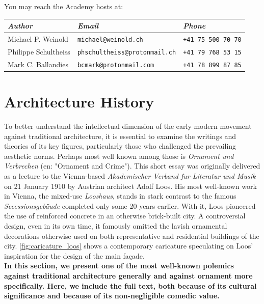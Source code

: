 \documentclass[a4paper]{article}
\begin{document}
You may reach the Academy hosts at:

\begin{NiceTabularX}{\textwidth}{llX}
\textit{Author} & \textit{Email} & \textit{Phone} \\
\hline
Michael P. Weinold & \texttt{michael@weinold.ch} & \texttt{+41 75 500 70 70} \\
Philippe Schultheiss & \texttt{phschultheiss@protonmail.ch} & \texttt{+41 79 768 53 15} \\
Mark C. Ballandies & \texttt{bcmark@protonmail.com} & \texttt{+41 78 899 87 85}
\end{NiceTabularX}

\tableofcontents

\clearpage
\section{Architecture History}

\begin{mdframed}[linewidth=1pt, roundcorner=5pt, innerleftmargin=10pt, innerrightmargin=10pt, innertopmargin=10pt, innerbottommargin=10pt, linecolor=black, backgroundcolor=white, userdefinedwidth=\textwidth]
    To better understand the intellectual dimension of the early modern movement against traditional architecture, it is essential to examine the writings and theories of its key figures, particularly those who challenged the prevailing aesthetic norms. Perhaps most well known among those is \textit{Ornament und Verbrechen} \cite{loos_ornament_1908} (en: "Ornament and Crime"). This short essay was originally delivered as a lecture to the Vienna-based \textit{Akademischer Verband fur Literatur und Musik} on 21 January 1910 by Austrian architect Adolf Loos. His most well-known work in Vienna, the mixed-use \textit{Looshaus}, stands in stark contrast to the famous \textit{Secessionsgebäude} completed only some 20 years earlier. With it, Loos pioneered the use of reinforced concrete in an otherwise brick-built city. A controversial design, even in its own time, it famously omitted the lavish ornamental decorations otherwise used on both representative and residential buildings of the city. \cref{fig:caricature_loos} shows a contemporary caricature speculating on Loos' inspiration for the design of the main façade. \\
    \textbf{In this section, we present one of the most well-known polemics against traditional architecture generally and against ornament more specifically. Here, we include the full text, both because of its cultural significance and because of its non-negligible comedic value.}
    \label{fig:caricature_loos}
\end{mdframed}
\end{document}

